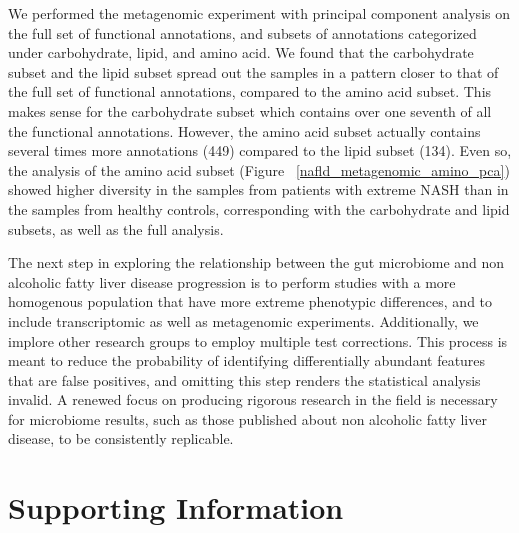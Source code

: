 We performed the metagenomic experiment with principal component analysis on the full set of functional annotations, and subsets of annotations categorized under carbohydrate, lipid, and amino acid. We found that the carbohydrate subset and the lipid subset spread out the samples in a pattern closer to that of the full set of functional annotations, compared to the amino acid subset. This makes sense for the carbohydrate subset which contains over one seventh of all the functional annotations. However, the amino acid subset actually contains several times more annotations (449) compared to the lipid subset (134). Even so, the analysis of the amino acid subset (Figure ~\ref{nafld_metagenomic_amino_pca}) showed higher diversity in the samples from patients with extreme NASH than in the samples from healthy controls, corresponding with the carbohydrate and lipid subsets, as well as the full analysis.

The next step in exploring the relationship between the gut microbiome and non alcoholic fatty liver disease progression is to perform studies with a more homogenous population that have more extreme phenotypic differences, and to include transcriptomic as well as metagenomic experiments. Additionally, we implore other research groups to employ multiple test corrections. This process is meant to reduce the probability of identifying differentially abundant features that are false positives, and omitting this step renders the statistical analysis invalid. A renewed focus on producing rigorous research in the field is necessary for microbiome results, such as those published about non alcoholic fatty liver disease, to be consistently replicable.

\section*{{Supporting Information}}

